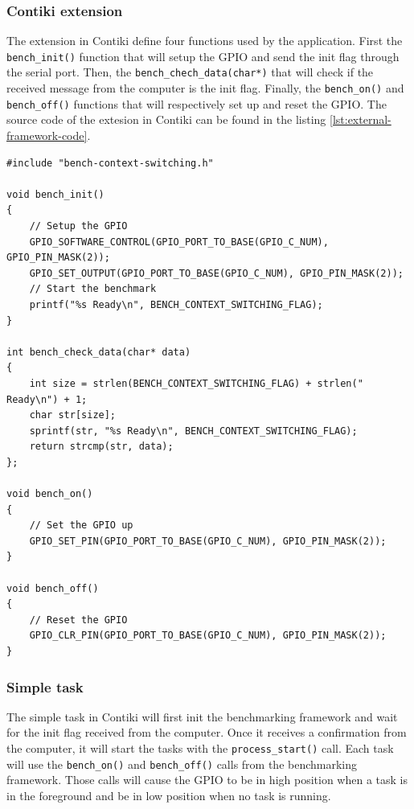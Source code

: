 \subsubsection{Contiki extension}
The extension in Contiki define four functions used by the application.
First the \texttt{bench\_init()} function that will setup the GPIO and send the init flag through the serial port.
Then, the \texttt{bench\_chech\_data(char*)} that will check if the received message from the computer is the init flag.
Finally, the \texttt{bench\_on()} and \texttt{bench\_off()} functions that will respectively set up and reset the GPIO.
The source code of the extesion in Contiki can be found in the listing \ref{lst:external-framework-code}.


\begin{lstlisting}[style=CStyle, float, label={lst:external-framework-code}, caption={Source code of the extesion in Contiki}]
#include "bench-context-switching.h"

void bench_init()
{
    // Setup the GPIO
    GPIO_SOFTWARE_CONTROL(GPIO_PORT_TO_BASE(GPIO_C_NUM), GPIO_PIN_MASK(2));
    GPIO_SET_OUTPUT(GPIO_PORT_TO_BASE(GPIO_C_NUM), GPIO_PIN_MASK(2));
    // Start the benchmark
    printf("%s Ready\n", BENCH_CONTEXT_SWITCHING_FLAG);
}

int bench_check_data(char* data)
{
    int size = strlen(BENCH_CONTEXT_SWITCHING_FLAG) + strlen(" Ready\n") + 1;
    char str[size];
    sprintf(str, "%s Ready\n", BENCH_CONTEXT_SWITCHING_FLAG);
    return strcmp(str, data);
};

void bench_on()
{
    // Set the GPIO up
    GPIO_SET_PIN(GPIO_PORT_TO_BASE(GPIO_C_NUM), GPIO_PIN_MASK(2));
}

void bench_off()
{
    // Reset the GPIO
    GPIO_CLR_PIN(GPIO_PORT_TO_BASE(GPIO_C_NUM), GPIO_PIN_MASK(2));
}
\end{lstlisting}

\subsubsection{Simple task}
The simple task in Contiki will first init the benchmarking framework and wait for the init flag received from the computer.
Once it receives a confirmation from the computer, it will start the tasks with the \texttt{process\_start()} call.
Each task will use the \texttt{bench\_on()} and \texttt{bench\_off()} calls from the benchmarking framework.
Those calls will cause the GPIO to be in high position when a task is in the foreground and be in low position when no task is running.

